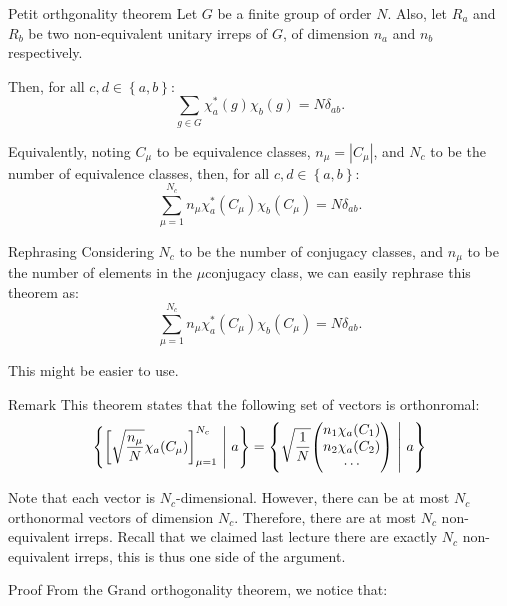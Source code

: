 \documentclass[a4paper]{article}
\begin{document}
\begin{parag}{Petit orthgonality theorem}
    Let $G$ be a finite group of order $N$. Also, let $R_a$ and $R_b$ be two non-equivalent unitary irreps of $G$, of dimension $n_a$ and $n_b$ respectively.

    Then, for all $c, d \in \left\{a, b\right\}$: 
    \[\sum_{g \in G} \chi_a^*\left(g\right) \chi_b\left(g\right) = N \delta_{ab}.\]

    Equivalently, noting $C_{\mu}$ to be equivalence classes, $n_{\mu} = \left|C_{\mu}\right|$, and $N_c$ to be the number of equivalence classes, then, for all $c, d \in \left\{a, b\right\}$:
    \[\sum_{\mu = 1}^{N_c} n_{\mu} \chi_a^*\left(C_{\mu}\right) \chi_b\left(C_{\mu}\right) = N \delta_{ab}.\]

    \begin{subparag}{Rephrasing}
        Considering $N_c$ to be the number of conjugacy classes, and $n_{\mu}$ to be the number of elements in the $\mu$\Th conjugacy class, we can easily rephrase this theorem as: 
        \[\sum_{\mu=1}^{N_c} n_{\mu} \chi_a^*\left(C_{\mu}\right) \chi_b\left(C_{\mu}\right) = N \delta_{ab}.\]

        This might be easier to use.
    \end{subparag}

    \begin{subparag}{Remark}
        This theorem states that the following set of vectors is orthonromal: 
        \[\left\{\left[\sqrt{\frac{n_{\mu}}{N}} \chi_a\left(C_{\mu}\right)\right]_{\mu = 1}^{N_c} \suchthat a\right\} = \left\{\sqrt{\frac{1}{N}} \begin{pmatrix} n_1 \chi_a\left(C_1\right) \\ n_2 \chi_a\left(C_2\right) \\ \cdots \end{pmatrix} \suchthat a\right\}\]
        
        Note that each vector is $N_c$-dimensional. However, there can be at most $N_c$ orthonormal vectors of dimension $N_c$. Therefore, there are at most $N_c$ non-equivalent irreps. Recall that we claimed last lecture there are exactly $N_c$ non-equivalent irreps, this is thus one side of the argument.
    \end{subparag}
    
    \begin{subparag}{Proof}
        From the Grand orthogonality theorem, we notice that: 
        

\end{subparag}
\end{parag}
\end{document}
